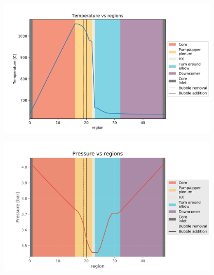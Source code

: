 \begin{figure}[ht] 
\centering
\begin{minipage}{.5\textwidth}
  \centering
  \includegraphics[width=1.0\linewidth]{images/BaseCaseTemperature.png}
  \label{fig:BaseCaseTemp}
\end{minipage}%
\begin{minipage}{.5\textwidth}
  \centering
  \includegraphics[width=1.0\linewidth]{images/BaseCasePressure.png}
  \label{fig:BaseCasePress}
\end{minipage}
\end{figure}

